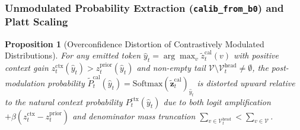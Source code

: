 \documentclass[11pt]{article}
\newtheorem{proposition}{Proposition}
\begin{document}
\subsubsection{Unmodulated Probability Extraction (\texttt{calib\_from\_b0}) and Platt Scaling}
\begin{proposition}[Overconfidence Distortion of Contrastively Modulated Distributions]
\label{prop:contrastive_distortion}
For any emitted token $\hat{y}_t = \arg\max_v \tilde{z}_t^{\text{cal}}(v)$ with positive context gain $z_t^{\text{ctx}}(\hat{y}_t) > z_t^{\text{prior}}(\hat{y}_t)$ and non-empty tail $\mathcal{V} \setminus \mathcal{V}_t^{\text{head}} \neq \emptyset$, the post-modulation probability $\tilde{P}_t^{\text{cal}}(\hat{y}_t) = \text{Softmax}(\tilde{\mathbf{z}}_t^{\text{cal}})_{\hat{y}_t}$ is distorted upward relative to the natural context probability $P_t^{\text{ctx}}(\hat{y}_t)$ due to both logit amplification $+\beta(z_t^{\text{ctx}} - z_t^{\text{prior}})$ and denominator mass truncation $\sum_{v \in \mathcal{V}_t^{\text{head}}} < \sum_{v \in \mathcal{V}}$.
\end{proposition}
\end{document}
